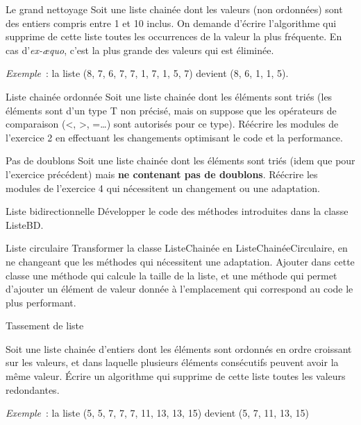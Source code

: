 	\begin{Exercice}{Le grand nettoyage}
		Soit une liste chainée dont les valeurs (non ordonnées) sont des 
		entiers compris entre 1 et 10 inclus. On demande
		d'écrire l'algorithme qui supprime de cette liste toutes les 
		occurrences de la valeur la plus fréquente. En cas
		d'\textit{ex-æquo}, c'est la plus grande des valeurs qui est éliminée.

		\textit{Exemple}~: la liste (8, 7, 6, 7, 7, 1, 7, 1, 5, 7) devient (8, 6, 1, 1, 5).
	\end{Exercice}

	\begin{Exercice}{Liste chainée ordonnée}
		Soit une liste chainée dont les éléments sont triés (les 
		éléments sont d'un type T non précisé, mais on suppose que les
		opérateurs de comparaison (<, >, ={\dots}) sont autorisés pour 
		ce type). Réécrire les modules de l'exercice 2 en effectuant 
		les changements optimisant le code et la performance.
	\end{Exercice}

	\begin{Exercice}{Pas de doublons}
		Soit une liste chainée dont les éléments sont triés (idem 
		que pour l'exercice précédent) mais \textbf{ne contenant pas
		de doublons}. Réécrire les modules de l'exercice 4 qui 
		nécessitent un changement ou une adaptation.
	\end{Exercice}

	\begin{Exercice}{Liste bidirectionnelle}
		Développer le code des méthodes introduites dans la classe ListeBD.
	\end{Exercice}
	
	\begin{Exercice}{Liste circulaire}
		Transformer la classe ListeChainée en ListeChainéeCirculaire, 
		en ne changeant que les méthodes qui nécessitent une
		adaptation. Ajouter dans cette classe une méthode qui calcule 
		la taille de la liste, et une méthode qui permet
		d'ajouter un élément de valeur donnée à l'emplacement qui 
		correspond au code le plus performant.
	\end{Exercice}

	\begin{Exercice}{Tassement de liste}
	
		Soit une liste chainée d'entiers dont les éléments sont ordonnés 
		en ordre croissant sur les valeurs, et dans laquelle
		plusieurs éléments consécutifs peuvent avoir la même valeur. 
		Écrire un algorithme qui supprime de cette liste toutes
		les valeurs redondantes.

		\textit{Exemple}~: la liste (5, 5, 7, 7, 7, 11, 13, 13, 15) devient (5, 7, 11, 13, 15)
	\end{Exercice}
	

